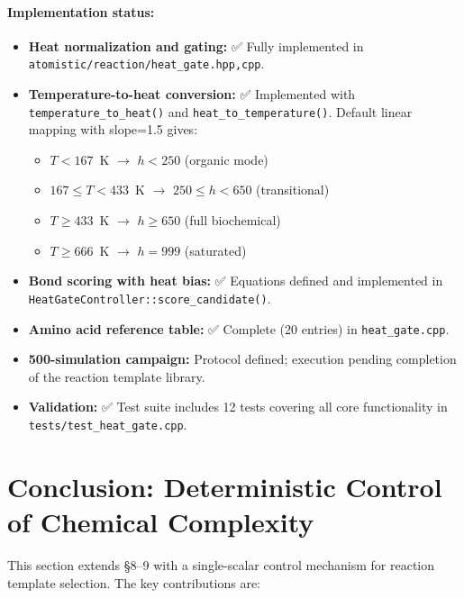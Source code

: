 \documentclass[11pt]{article}
\begin{document}
\paragraph{Implementation status:}
\begin{itemize}
\item \textbf{Heat normalization and gating:} ✅ Fully implemented in
      \texttt{atomistic/reaction/heat\_gate.{hpp,cpp}}.
\item \textbf{Temperature-to-heat conversion:} ✅ Implemented with
      \texttt{temperature\_to\_heat()} and \texttt{heat\_to\_temperature()}.
      Default linear mapping with slope=1.5 gives:
      \begin{itemize}
      \item $T < 167$~K $\to$ $h < 250$ (organic mode)
      \item $167 \le T < 433$~K $\to$ $250 \le h < 650$ (transitional)
      \item $T \ge 433$~K $\to$ $h \ge 650$ (full biochemical)
      \item $T \ge 666$~K $\to$ $h = 999$ (saturated)
      \end{itemize}
\item \textbf{Bond scoring with heat bias:} ✅ Equations defined and implemented
      in \texttt{HeatGateController::score\_candidate()}.
\item \textbf{Amino acid reference table:} ✅ Complete (20 entries) in
      \texttt{heat\_gate.cpp}.
\item \textbf{500-simulation campaign:} Protocol defined; execution pending
      completion of the reaction template library.
\item \textbf{Validation:} ✅ Test suite includes 12 tests covering all
      core functionality in \texttt{tests/test\_heat\_gate.cpp}.
\end{itemize}

\section{Conclusion: Deterministic Control of Chemical Complexity}

This section extends \S8--9 with a single-scalar control mechanism for
reaction template selection.  The key contributions are:
\end{document}
